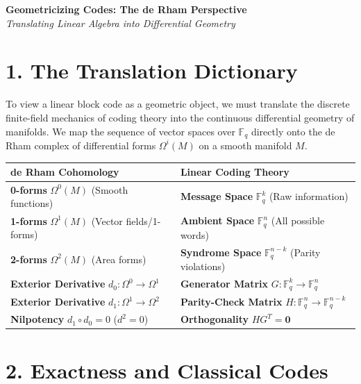 \documentclass[11pt, a4paper, twoside]{article}
\newcommand{\F}{\mathbb{F}}
\begin{document}
	
	\begin{center}
		{\Large \textbf{Geometricizing Codes: The de Rham Perspective}} \\[0.5em]
		{\normalsize \textit{Translating Linear Algebra into Differential Geometry}}
	\end{center}
	\vspace{1em}
	
	\section*{1. The Translation Dictionary}
	
	To view a linear block code as a geometric object, we must translate the discrete finite-field mechanics of coding theory into the continuous differential geometry of manifolds. We map the sequence of vector spaces over $\F_q$ directly onto the de Rham complex of differential forms $\Omega^i(M)$ on a smooth manifold $M$.
	
	\begin{table}[h!]
		\centering
		\renewcommand{\arraystretch}{1.4}
		\begin{tabular}{@{}ll@{}}
			\toprule
			\textbf{de Rham Cohomology} & \textbf{Linear Coding Theory} \\
			\midrule
			\textbf{0-forms} $\Omega^0(M)$ (Smooth functions) & \textbf{Message Space} $\F_q^k$ (Raw information) \\
			\textbf{1-forms} $\Omega^1(M)$ (Vector fields/1-forms) & \textbf{Ambient Space} $\F_q^n$ (All possible words) \\
			\textbf{2-forms} $\Omega^2(M)$ (Area forms) & \textbf{Syndrome Space} $\F_q^{n-k}$ (Parity violations) \\
			\textbf{Exterior Derivative} $d_0: \Omega^0 \to \Omega^1$ & \textbf{Generator Matrix} $G: \F_q^k \to \F_q^n$ \\
			\textbf{Exterior Derivative} $d_1: \Omega^1 \to \Omega^2$ & \textbf{Parity-Check Matrix} $H: \F_q^n \to \F_q^{n-k}$ \\
			\textbf{Nilpotency} $d_1 \circ d_0 = 0$ ($d^2=0$) & \textbf{Orthogonality} $H G^T = \mathbf{0}$ \\
			\bottomrule
		\end{tabular}
	\end{table}
	
	\section*{2. Exactness and Classical Codes}
	
\end{document}
